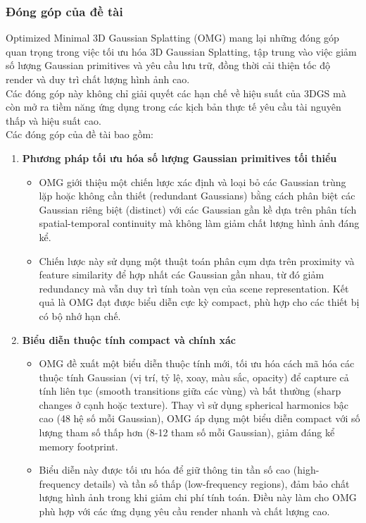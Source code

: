 \subsubsection{Đóng góp của đề tài}
Optimized Minimal 3D Gaussian Splatting (OMG) mang lại những đóng góp quan trọng trong việc tối ưu hóa 3D Gaussian Splatting, tập trung vào việc giảm số lượng Gaussian primitives và yêu cầu lưu trữ, đồng thời cải thiện tốc độ render và duy trì chất lượng hình ảnh cao. \\

Các đóng góp này không chỉ giải quyết các hạn chế về hiệu suất của 3DGS mà còn mở ra tiềm năng ứng dụng trong các kịch bản thực tế yêu cầu tài nguyên thấp và hiệu suất cao. \\

Các đóng góp của đề tài bao gồm:
\begin{enumerate}
    \item \textbf{Phương pháp tối ưu hóa số lượng Gaussian primitives tối thiểu}
    \begin{itemize}
        \item OMG giới thiệu một chiến lược xác định và loại bỏ các Gaussian trùng lặp hoặc không cần thiết (redundant Gaussians) bằng cách phân biệt các Gaussian riêng biệt (distinct) với các Gaussian gần kề dựa trên phân tích spatial-temporal continuity mà không làm giảm chất lượng hình ảnh đáng kể.
        \item Chiến lược này sử dụng một thuật toán phân cụm dựa trên proximity và feature similarity để hợp nhất các Gaussian gần nhau, từ đó giảm redundancy mà vẫn duy trì tính toàn vẹn của scene representation. Kết quả là OMG đạt được biểu diễn cực kỳ compact, phù hợp cho các thiết bị có bộ nhớ hạn chế.
    \end{itemize}
    \item \textbf{Biểu diễn thuộc tính compact và chính xác}
    \begin{itemize}
        \item OMG đề xuất một biểu diễn thuộc tính mới, tối ưu hóa cách mã hóa các thuộc tính Gaussian (vị trí, tỷ lệ, xoay, màu sắc, opacity) để capture cả tính liên tục (smooth transitions giữa các vùng) và bất thường (sharp changes ở cạnh hoặc texture). Thay vì sử dụng spherical harmonics bậc cao (48 hệ số mỗi Gaussian), OMG áp dụng một biểu diễn compact với số lượng tham số thấp hơn (8-12 tham số mỗi Gaussian), giảm đáng kể memory footprint.
        \item Biểu diễn này được tối ưu hóa để giữ thông tin tần số cao (high-frequency details) và tần số thấp (low-frequency regions), đảm bảo chất lượng hình ảnh trong khi giảm chi phí tính toán. Điều này làm cho OMG phù hợp với các ứng dụng yêu cầu render nhanh và chất lượng cao.
    \end{itemize}
\end{enumerate}


